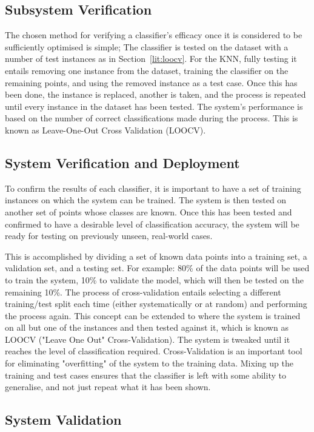 \subsection{Subsystem Verification}
The chosen method for verifying a classifier's efficacy once it is considered to be sufficiently optimised is simple; The classifier is tested on the dataset with a number of test instances as in Section~\ref{lit:loocv}. For the KNN, fully testing it entails removing one instance from the dataset, training the classifier on the remaining points, and using the removed instance as a test case. Once this has been done, the instance is replaced, another is taken, and the process is repeated until every instance in the dataset has been tested. The system's performance is based on the number of correct classifications made during the process. This is known as Leave-One-Out Cross Validation (LOOCV).


\subsection{System Verification and Deployment}
To confirm the results of each classifier, it is important to have a set of training instances on which the system can be trained. The system is then tested on another set of points whose classes are known. Once this has been tested and confirmed to have a desirable level of classification accuracy, the system will be ready for testing on previously unseen, real-world cases. 

This is accomplished by dividing a set of known data points into a training set, a validation set, and a testing set. For example: 80\% of the data points will be used to train the system, 10\% to validate the model, which will then be tested on the remaining 10\%. The process of cross-validation entails selecting a different training/test split each time (either systematically or at random) and performing the process again. This concept can be extended to where the system is trained on all but one of the instances and then tested against it, which is known as LOOCV ("Leave One Out" Cross-Validation). The system is tweaked until it reaches the level of classification required. Cross-Validation is an important tool for eliminating "overfitting" of the system to the training data. Mixing up the training and test cases ensures that the classifier is left with some ability to generalise, and not just repeat what it has been shown.

\subsection{System Validation}
